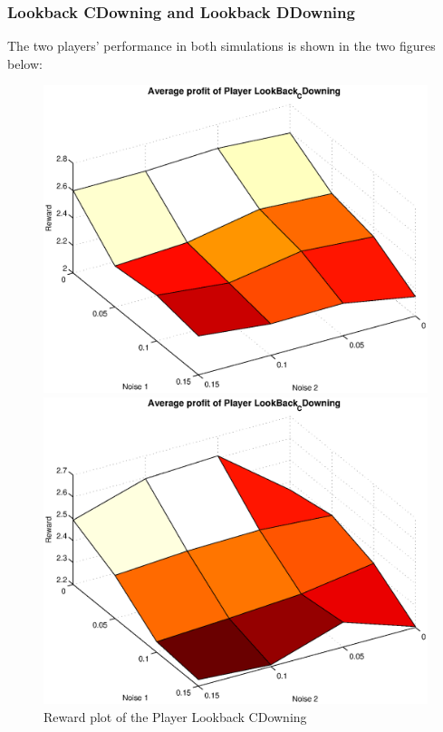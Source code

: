 \documentclass[11pt,twoside]{article}
\begin{document}
\subsubsection{Lookback CDowning and Lookback DDowning}
The two players' performance in both simulations is shown in the two figures below:
\begin{figure}[h]

\begin{minipage}[hbt]{0.65\textwidth}
	\centering
	\includegraphics[width=\textwidth]{pics/simulation1/Reward_vs_Noise_of_Player_LookBack_CDowning}
\end{minipage}
\hfill
\begin{minipage}[hbt]{0.3\textwidth}
	\centering
	\includegraphics[width=\textwidth]{pics/simulation2/Reward_vs_Noise_of_Player_LookBack_CDowning}
\end{minipage}
	\caption{Reward plot of the Player Lookback CDowning}
	\label{pic player lbcd}
\end{figure}
\end{document}
